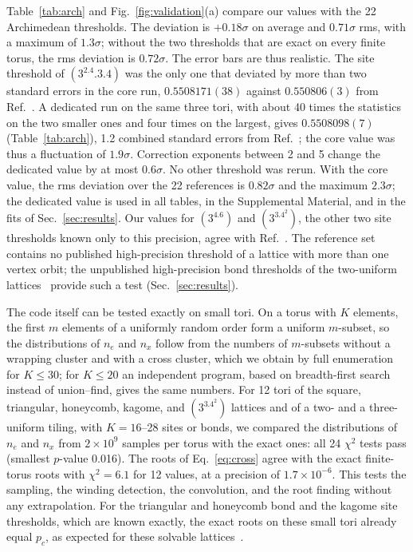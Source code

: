 \documentclass[pre,twocolumn,superscriptaddress,longbibliography,floatfix]{revtex4-2}
\newcommand{\pc}{p_c}
\begin{document}
Table~\ref{tab:arch} and Fig.~\ref{fig:validation}(a) compare our values with the 22 Archimedean thresholds. The deviation is $+0.18\sigma$ on average and $0.71\sigma$ rms, with a maximum of $1.3\sigma$; without the two thresholds that are exact on every finite torus, the rms deviation is $0.72\sigma$. The error bars are thus realistic. The site threshold of $(3^2.4.3.4)$ was the only one that deviated by more than two standard errors in the core run, $0.5508171(38)$ against $0.550806(3)$ from Ref.~\cite{SudingZiff99}. A dedicated run on the same three tori, with about 40 times the statistics on the two smaller ones and four times on the largest, gives $0.5508098(7)$ (Table~\ref{tab:arch}), 1.2 combined standard errors from Ref.~\cite{SudingZiff99}; the core value was thus a fluctuation of $1.9\sigma$. Correction exponents between 2 and 5 change the dedicated value by at most $0.6\sigma$. No other threshold was rerun. With the core value, the rms deviation over the 22 references is $0.82\sigma$ and the maximum $2.3\sigma$; the dedicated value is used in all tables, in the Supplemental Material, and in the fits of Sec.~\ref{sec:results}. Our values for $(3^4.6)$ and $(3^3.4^2)$, the other two site thresholds known only to this precision, agree with Ref.~\cite{SudingZiff99}. The reference set contains no published high-precision threshold of a lattice with more than one vertex orbit; the unpublished high-precision bond thresholds of the two-uniform lattices~\cite{GuZiff} provide such a test (Sec.~\ref{sec:results}).

The code itself can be tested exactly on small tori. On a torus with $K$ elements, the first $m$ elements of a uniformly random order form a uniform $m$-subset, so the distributions of $n_e$ and $n_x$ follow from the numbers of $m$-subsets without a wrapping cluster and with a cross cluster, which we obtain by full enumeration for $K\le30$; for $K\le20$ an independent program, based on breadth-first search instead of union--find, gives the same numbers. For 12 tori of the square, triangular, honeycomb, kagome, and $(3^3.4^2)$ lattices and of a two- and a three-uniform tiling, with $K=16$--28 sites or bonds, we compared the distributions of $n_e$ and $n_x$ from $2\times10^9$ samples per torus with the exact ones: all 24 $\chi^2$ tests pass (smallest $p$-value 0.016). The roots of Eq.~\eqref{eq:cross} agree with the exact finite-torus roots with $\chi^2=6.1$ for 12 values, at a precision of $1.7\times10^{-6}$. This tests the sampling, the winding detection, the convolution, and the root finding without any extrapolation. For the triangular and honeycomb bond and the kagome site thresholds, which are known exactly, the exact roots on these small tori already equal $\pc$, as expected for these solvable lattices~\cite{JacobsenScullard13}.
\end{document}
